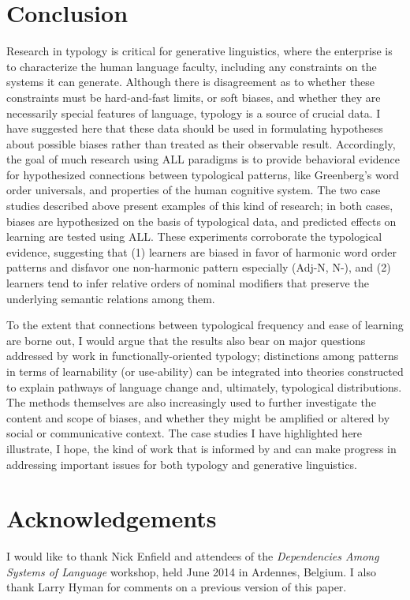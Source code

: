 \documentclass[output=paper]{langsci/langscibook}
\begin{document}
\section{Conclusion}
   
Research in typology is critical for generative linguistics, where the enterprise is to characterize the human language faculty, including any constraints on the systems it can generate. Although there is disagreement as to whether these constraints must be hard-and-fast limits, or soft biases, and whether they are necessarily special features of language, typology is a source of crucial data. I have suggested here that these data should be used in formulating hypotheses about possible biases rather than treated as their observable result. Accordingly, the goal of much research using ALL paradigms is to provide behavioral evidence for hypothesized connections between typological patterns, like Greenberg's word order universals,   and properties of the human cognitive system. The two case studies described above present examples of this kind of research; in both cases, biases are hypothesized on the basis of typological data, and predicted effects on learning are tested using ALL.  These experiments corroborate the typological  evidence, suggesting that (1) learners are biased in favor of harmonic word order patterns and disfavor one non-harmonic pattern especially (Adj-N, N-), and (2) learners tend to infer relative orders of nominal modifiers that preserve the underlying semantic relations among them.    

To the extent that connections between typological frequency and ease of learning are borne out, I would argue that the results also bear on major questions addressed by work in functionally-oriented typology; distinctions among patterns in terms of learnability (or use-ability) can be integrated into theories constructed to explain pathways of language change and, ultimately, typological distributions. The methods themselves are also increasingly used to further investigate the content and scope of biases, and whether they might be amplified or altered by social or communicative context. The case studies I have highlighted here illustrate, I hope, the kind of work that is informed by and can make progress in addressing important issues for both typology and generative linguistics.

\section*{Acknowledgements}
I would like to thank Nick Enfield and attendees of the \textit{Dependencies Among Systems of Language} workshop, held June 2014 in Ardennes, Belgium. I also thank Larry Hyman for comments on a previous version of this paper.%
 
{\sloppy
\printbibliography[heading=subbibliography,notkeyword=this]
}
\end{document}
